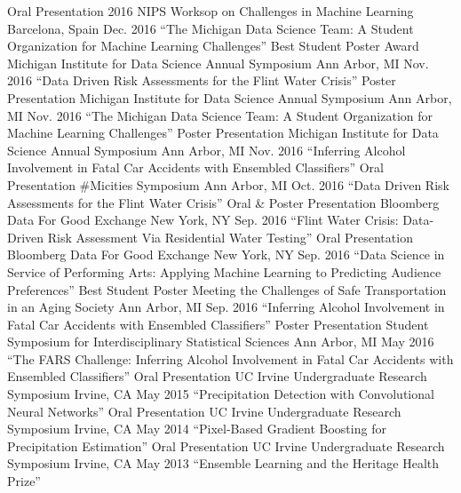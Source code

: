 \begin{cventries}
    \cventrynarrow
        {Oral Presentation}
        {2016 NIPS Worksop on Challenges in Machine Learning}
        {Barcelona, Spain}
        {Dec. 2016}
        {
        ``The Michigan Data Science Team: A Student Organization for Machine Learning Challenges''
        }
    \cventrynarrow
        {Best Student Poster Award}
        {Michigan Institute for Data Science Annual Symposium}
        {Ann Arbor, MI}
        {Nov. 2016}
        {
        ``Data Driven Risk Assessments for the Flint Water Crisis''
        }
    \cventrynarrow
        {Poster Presentation}
        {Michigan Institute for Data Science Annual Symposium}
        {Ann Arbor, MI}
        {Nov. 2016}
        {
        ``The Michigan Data Science Team: A Student Organization for Machine Learning Challenges''
        }
    \cventrynarrow
        {Poster Presentation}
        {Michigan Institute for Data Science Annual Symposium}
        {Ann Arbor, MI}
        {Nov. 2016}
        {
        ``Inferring Alcohol Involvement in Fatal Car Accidents with Ensembled Classifiers''
        }
    \cventry
        {Oral Presentation}
        {\#Micities Symposium}
        {Ann Arbor, MI}
        {Oct. 2016}
        {
        ``Data Driven Risk Assessments for the Flint Water Crisis''
        }
    \cventry
        {Oral \& Poster Presentation}
        {Bloomberg Data For Good Exchange}
        {New York, NY}
        {Sep. 2016}
        {
        ``Flint Water Crisis: Data-Driven Risk Assessment Via Residential Water Testing''
        }
    \cventry
        {Oral Presentation}
        {Bloomberg Data For Good Exchange}
        {New York, NY}
        {Sep. 2016}
        {
        ``Data Science in Service of Performing Arts: Applying Machine
        Learning to Predicting Audience Preferences''
        }
    \cventryextranarrow
        {Best Student Poster}
        {Meeting the Challenges of Safe Transportation in an Aging
          Society}
        {Ann Arbor, MI}
        {Sep. 2016}
        {
        ``Inferring Alcohol Involvement in Fatal Car Accidents with Ensembled Classifiers''
        }
    \cventryextranarrow
        {Poster Presentation}
        {Student Symposium for Interdisciplinary Statistical Sciences}
        {Ann Arbor, MI}
        {May 2016}
        {
        ``The FARS Challenge: Inferring Alcohol Involvement in Fatal Car Accidents with Ensembled Classifiers''
        }
    \cventrynarrow
        {Oral Presentation}
        {UC Irvine Undergraduate Research Symposium}
        {Irvine, CA}
        {May 2015}
        {
        ``Precipitation Detection with Convolutional Neural Networks''
        }
    \cventrynarrow
        {Oral Presentation}
        {UC Irvine Undergraduate Research Symposium}
        {Irvine, CA}
        {May 2014}
        {
        ``Pixel-Based Gradient Boosting for Precipitation Estimation''
        }
    \cventrynarrow
        {Oral Presentation}
        {UC Irvine Undergraduate Research Symposium}
        {Irvine, CA}
        {May 2013}
        {
        ``Ensemble Learning and the Heritage Health Prize''
        }
\end{cventries}
